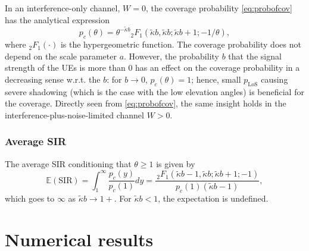\documentclass[conference]{IEEEtran}
\theoremstyle{definition}
\theoremstyle{plain}
\begin{document}
          In an interference-only channel, $W=0$, the coverage probability \eqref{eq:probofcov} has the analytical expression
          \begin{equation}
p_c(\theta) =  \theta^{-\tilde{\kappa}b} {_2F_1}\left(\tilde{\kappa}b, \tilde{\kappa}b;\tilde{\kappa}b + 1; -1/\theta \right),
          \end{equation}
          where $_2F_1(\cdot)$ is the hypergeometric function. The coverage probability does not depend on the scale parameter $a$. However, the probability $b$ that the signal strength of the UEs is more than $0$ has an effect on the coverage probability in a decreasing sense w.r.t. the $b$: for $b \rightarrow 0$, $p_c(\theta) =1$; hence, small $p_{\text{LoS}}$ causing severe shadowing (which is the case with the low elevation angles) is beneficial for the coverage. Directly seen from \eqref{eq:probofcov}, the same insight holds in the interference-plus-noise-limited channel $W>0$.

          \subsubsection{Average SIR}
          The average SIR conditioning that $\theta \geq 1$ is given by
          \begin{equation}
            \mathbb{E}(\text{SIR})=\int_{1}^{\infty}\frac{p_c(y)}{p_c(1)}dy= \frac{\, _2F_1(\tilde{\kappa}b-1,\tilde{\kappa}b;\tilde{\kappa}b+1;-1)}{p_c(1)(\tilde{\kappa}b-1)},
          \end{equation}          
          which goes to $\infty$ as $\tilde{\kappa}b \rightarrow 1+$. For $\tilde{\kappa}b<1$, the expectation is undefined.
          

          \section{Numerical results}

          
          
          

          
         
         
             
             
\end{document}
